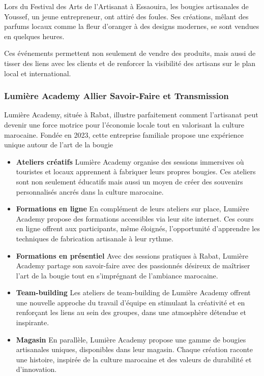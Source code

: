 \documentclass[11pt,fleqn,onecolumn,oneside]{book}
\begin{document}
\begin{example}
Lors du Festival des Arts de l’Artisanat à Essaouira, les bougies artisanales de Youssef, un jeune entrepreneur, ont attiré des foules. Ses créations, mêlant des parfums locaux comme la fleur d’oranger à des designs modernes, se sont vendues en quelques heures.
\end{example}

Ces événements permettent non seulement de vendre des produits, mais aussi de tisser des liens avec les clients et de renforcer la visibilité des artisans sur le plan local et international.

\subsubsection*{Lumière Academy Allier Savoir-Faire et Transmission}

Lumière Academy, située à Rabat, illustre parfaitement comment l’artisanat peut devenir une force motrice pour l’économie locale tout en valorisant la culture marocaine. Fondée en 2023, cette entreprise familiale propose une expérience unique autour de l’art de la bougie

\begin{itemize}
    \item \textbf{Ateliers créatifs} Lumière Academy organise des sessions immersives où touristes et locaux apprennent à fabriquer leurs propres bougies. Ces ateliers sont non seulement éducatifs mais aussi un moyen de créer des souvenirs personnalisés ancrés dans la culture marocaine.
    \item \textbf{Formations en ligne} En complément de leurs ateliers sur place, Lumière Academy propose des formations accessibles via leur site internet. Ces cours en ligne offrent aux participants, même éloignés, l’opportunité d’apprendre les techniques de fabrication artisanale à leur rythme.
    \item \textbf{Formations en présentiel} Avec des sessions pratiques à Rabat, Lumière Academy partage son savoir-faire avec des passionnés désireux de maîtriser l’art de la bougie tout en s’imprégnant de l’ambiance marocaine.
    \item \textbf{Team-building} Les ateliers de team-building de Lumière Academy offrent une nouvelle approche du travail d'équipe en stimulant la créativité et en renforçant les liens au sein des groupes, dans une atmosphère détendue et inspirante.
    \item \textbf{Magasin} En parallèle, Lumière Academy propose une gamme de bougies artisanales uniques, disponibles dans leur magasin. Chaque création raconte une histoire, inspirée de la culture marocaine et des valeurs de durabilité et d'innovation.
\end{itemize}
\end{document}
